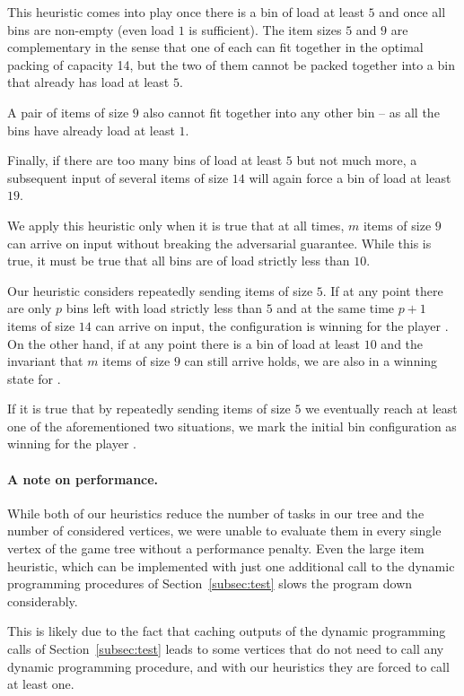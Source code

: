 This heuristic comes into play once there is a bin of load at least
$5$ and once all bins are non-empty (even load $1$ is sufficient). The
item sizes $5$ and $9$ are complementary in the sense that one of each
can fit together in the optimal packing of capacity 14, but the two of
them cannot be packed together into a bin that already has load at
least $5$.

A pair of items of size $9$ also cannot fit together into any other
bin -- as all the bins have already load at least $1$.

Finally, if there are too many bins of load at least $5$ but not much
more, a subsequent input of several items of size $14$ will again
force a bin of load at least $19$.

We apply this heuristic only when it is true that at all times, $m$
items of size $9$ can arrive on input without breaking the adversarial
guarantee. While this is true, it must be true that all bins are of
load strictly less than $10$.

Our heuristic considers repeatedly sending items of size $5$. If at
any point there are only $p$ bins left with load strictly less than
$5$ and at the same time $p+1$ items of size $14$ can arrive on input,
the configuration is winning for the player \adversary. On the other
hand, if at any point there is a bin of load at least $10$ and the
invariant that $m$ items of size $9$ can still arrive holds, we are
also in a winning state for \adversary.

If it is true that by repeatedly sending items of size $5$ we
eventually reach at least one of the aforementioned two situations,
we mark the initial bin configuration as winning for the player
\adversary.

\paragraph{A note on performance.} While both of our heuristics reduce
the number of tasks in our tree and the number of considered vertices,
we were unable to evaluate them in every single vertex of the game
tree without a performance penalty. Even the large item heuristic,
which can be implemented with just one additional call to the dynamic
programming procedures of Section~\ref{subsec:test} slows the program
down considerably.

This is likely due to the fact that caching outputs of the dynamic
programming calls of Section~\ref{subsec:test} leads to some vertices
that do not need to call any dynamic programming procedure, and with
our heuristics they are forced to call at least one.

